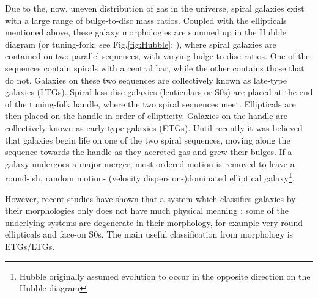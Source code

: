 	Due to the, now, uneven distribution of gas in the universe, spiral galaxies exist with a large range of bulge-to-disc mass ratios. Coupled with the ellipticals mentioned above, these galaxy morphologies are summed up in the Hubble diagram (or tuning-fork; see Fig.\ref{fig:Hubble}; \citealt{Hubble1982, deVaucouleurs1959}), where spiral galaxies are contained on two parallel sequences, with varying bulge-to-disc ratios. One of the sequences contain spirals with a central bar, while the other contains those that do not. Galaxies on these two sequences are collectively known as late-type galaxies (LTGs). Spiral-less disc galaxies (lenticulars or S0s) are placed at the end of the tuning-folk handle, where the two spiral sequences meet. Ellipticals are then placed on the handle in order of ellipticity. Galaxies on the handle are collectively known as early-type galaxies (ETGs). Until recently it was believed that galaxies begin life on one of the two spiral sequences, moving along the sequence towards the handle as they accreted gas and grew their bulges. If a galaxy undergoes a major merger, most ordered motion is removed to leave a round-ish, random motion- (velocity dispersion-)dominated elliptical galaxy\footnote{Hubble originally assumed evolution to occur in the opposite direction on the Hubble diagram}. 

	However, recent studies have shown that a system which classifies galaxies by their morphologies only does not have much physical meaning \citep[e.g.][]{Cappellari2011, Sanchez2011, Arnold2013, Bryant2014}: some of the underlying systems are degenerate in their morphology, for example very round ellipticals and face-on S0s. The main useful classification from morphology is ETGs/LTGs. 

